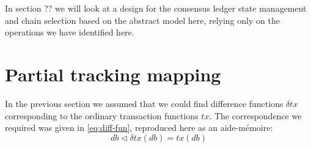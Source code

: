 \documentclass[11pt,a4paper]{article}
\begin{document}
In section ?? we will look at a design for the consensus ledger state
management and chain selection based on the abstract model here, relying only
on the operations we have identified here.

\section{Partial tracking mapping}

In the previous section we assumed that we could find difference functions
$\delta\mathit{tx}$ corresponding to the ordinary transaction functions
$\mathit{tx}$. The correspondence we required was given in \cref{eq:diff-fun},
reproduced here as an aide-m\'emoire:
\begin{equation*}
db \triangleleft \delta\mathit{tx}(\mathit{db}) = \mathit{tx}(\mathit{db})
\end{equation*}




\end{document}
